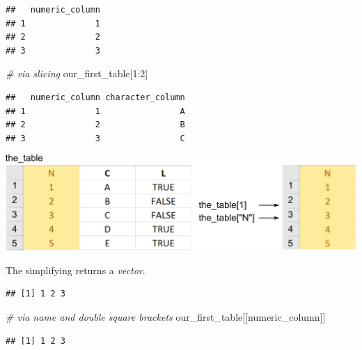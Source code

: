 \documentclass[
]{book}
\newenvironment{Shaded}{\begin{snugshade}}{\end{snugshade}}
\newcommand{\CommentTok}[1]{\textcolor[rgb]{0.56,0.35,0.01}{\textit{#1}}}
\newcommand{\DecValTok}[1]{\textcolor[rgb]{0.00,0.00,0.81}{#1}}
\newcommand{\NormalTok}[1]{#1}
\newcommand{\SpecialCharTok}[1]{\textcolor[rgb]{0.00,0.00,0.00}{#1}}
\newcommand{\StringTok}[1]{\textcolor[rgb]{0.31,0.60,0.02}{#1}}
\begin{document}
\begin{verbatim}
##   numeric_column
## 1              1
## 2              2
## 3              3
\end{verbatim}

\begin{Shaded}
\begin{Highlighting}[]
\CommentTok{\# via slicing}
\NormalTok{our\_first\_table[}\DecValTok{1}\SpecialCharTok{:}\DecValTok{2}\NormalTok{]}
\end{Highlighting}
\end{Shaded}

\begin{verbatim}
##   numeric_column character_column
## 1              1                A
## 2              2                B
## 3              3                C
\end{verbatim}

\begin{center}\includegraphics[width=1\linewidth]{images/table-subtable} \end{center}

The simplifying returns a \emph{vector}.

\begin{Shaded}
\end{Shaded}

\begin{verbatim}
## [1] 1 2 3
\end{verbatim}

\begin{Shaded}
\begin{Highlighting}[]
\CommentTok{\# via name and double square brackets}
\NormalTok{our\_first\_table[[}\StringTok{\textquotesingle{}numeric\_column\textquotesingle{}}\NormalTok{]]}
\end{Highlighting}
\end{Shaded}

\begin{verbatim}
## [1] 1 2 3
\end{verbatim}
\end{document}
